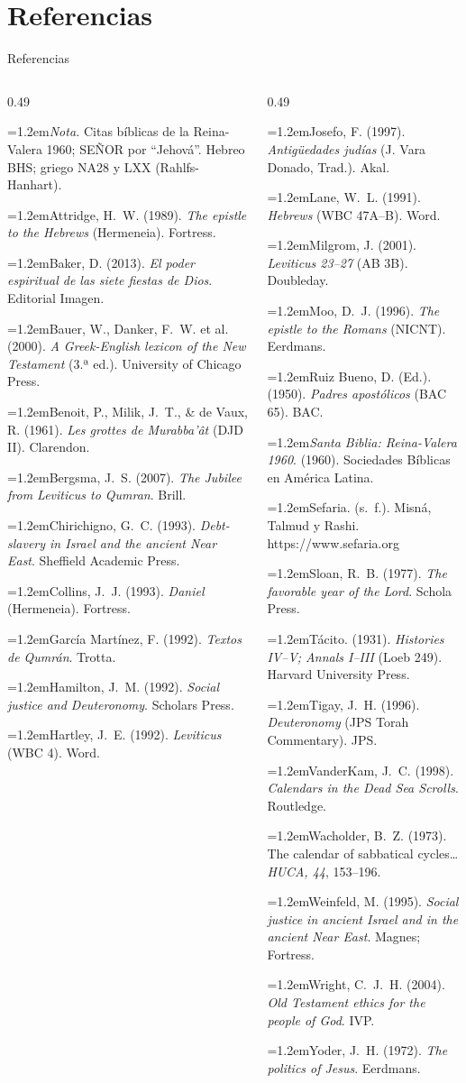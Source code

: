 \documentclass[hyperref={bookmarks=false},aspectratio=169]{beamer}
\newcommand{\SENOR}{S{\fontsize{0.78em}{1em}\selectfont EÑOR}}
\newcommand{\refapa}[1]{\par{\RaggedRight\hangindent=1.2em\hangafter=1\noindent #1\par}\vspace{3pt}}
\begin{document}
\section{Referencias}

\begin{frame}{Referencias}
\fontsize{5.6}{6.7}\selectfont
\begin{columns}[t,onlytextwidth]
\begin{column}{0.49\textwidth}
\refapa{\textit{Nota.} Citas bíblicas de la Reina-Valera 1960; \SENOR{} por ``Jehová''. Hebreo BHS; griego NA28 y LXX (Rahlfs-Hanhart).}
\refapa{Attridge, H.~W. (1989). \emph{The epistle to the Hebrews} (Hermeneia). Fortress.}
\refapa{Baker, D. (2013). \emph{El poder espiritual de las siete fiestas de Dios}. Editorial Imagen.}
\refapa{Bauer, W., Danker, F.~W. et al. (2000). \emph{A Greek-English lexicon of the New Testament} (3.ª ed.). University of Chicago Press.}
\refapa{Benoit, P., Milik, J.~T., \& de Vaux, R. (1961). \emph{Les grottes de Murabba'ât} (DJD II). Clarendon.}
\refapa{Bergsma, J.~S. (2007). \emph{The Jubilee from Leviticus to Qumran}. Brill.}
\refapa{Chirichigno, G.~C. (1993). \emph{Debt-slavery in Israel and the ancient Near East}. Sheffield Academic Press.}
\refapa{Collins, J.~J. (1993). \emph{Daniel} (Hermeneia). Fortress.}
\refapa{García Martínez, F. (1992). \emph{Textos de Qumrán}. Trotta.}
\refapa{Hamilton, J.~M. (1992). \emph{Social justice and Deuteronomy}. Scholars Press.}
\refapa{Hartley, J.~E. (1992). \emph{Leviticus} (WBC 4). Word.}
\end{column}
\begin{column}{0.49\textwidth}
\refapa{Josefo, F. (1997). \emph{Antigüedades judías} (J. Vara Donado, Trad.). Akal.}
\refapa{Lane, W.~L. (1991). \emph{Hebrews} (WBC 47A--B). Word.}
\refapa{Milgrom, J. (2001). \emph{Leviticus 23--27} (AB 3B). Doubleday.}
\refapa{Moo, D.~J. (1996). \emph{The epistle to the Romans} (NICNT). Eerdmans.}
\refapa{Ruiz Bueno, D. (Ed.). (1950). \emph{Padres apostólicos} (BAC 65). BAC.}
\refapa{\emph{Santa Biblia: Reina-Valera 1960}. (1960). Sociedades Bíblicas en América Latina.}
\refapa{Sefaria. (s.~f.). Misná, Talmud y Rashi. https://www.sefaria.org}
\refapa{Sloan, R.~B. (1977). \emph{The favorable year of the Lord}. Schola Press.}
\refapa{Tácito. (1931). \emph{Histories IV--V; Annals I--III} (Loeb 249). Harvard University Press.}
\refapa{Tigay, J.~H. (1996). \emph{Deuteronomy} (JPS Torah Commentary). JPS.}
\refapa{VanderKam, J.~C. (1998). \emph{Calendars in the Dead Sea Scrolls}. Routledge.}
\refapa{Wacholder, B.~Z. (1973). The calendar of sabbatical cycles\ldots{} \emph{HUCA, 44}, 153--196.}
\refapa{Weinfeld, M. (1995). \emph{Social justice in ancient Israel and in the ancient Near East}. Magnes; Fortress.}
\refapa{Wright, C.~J.~H. (2004). \emph{Old Testament ethics for the people of God}. IVP.}
\refapa{Yoder, J.~H. (1972). \emph{The politics of Jesus}. Eerdmans.}
\end{column}
\end{columns}
\end{frame}
\end{document}
